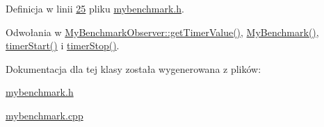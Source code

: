 Definicja w linii \hyperlink{mybenchmark_8h_source_l00025}{25} pliku \hyperlink{mybenchmark_8h_source}{mybenchmark.\-h}.



Odwołania w \hyperlink{mybenchmark_8h_source_l00060}{My\-Benchmark\-Observer\-::get\-Timer\-Value()}, \hyperlink{mybenchmark_8h_source_l00027}{My\-Benchmark()}, \hyperlink{mybenchmark_8cpp_source_l00012}{timer\-Start()} i \hyperlink{mybenchmark_8cpp_source_l00017}{timer\-Stop()}.



Dokumentacja dla tej klasy została wygenerowana z plików\-:\begin{DoxyCompactItemize}
\item 
\hyperlink{mybenchmark_8h}{mybenchmark.\-h}\item 
\hyperlink{mybenchmark_8cpp}{mybenchmark.\-cpp}\end{DoxyCompactItemize}
